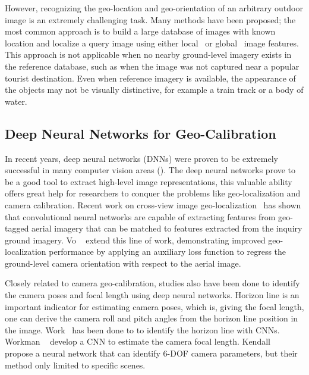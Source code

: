 However, recognizing the geo-location and geo-orientation of an
arbitrary outdoor image is an extremely challenging task.  Many
methods have been proposed; the most common approach is to build a
large database of images with known location and localize a query
image using either local~\cite{li2010location,schindler2008detecting}
or global~\cite{hays2008im2gps,doersch2012what} image features.  This
approach is not applicable when no nearby ground-level imagery exists
in the reference database, such as when the image was not captured
near a popular tourist destination.  Even when reference imagery is
available, the appearance of the objects may not be visually
distinctive, for example a train track or a body of water. 


\subsection{Deep Neural Networks for Geo-Calibration}
In recent years, deep neural networks (DNNs) were proven to be
extremely successful in many computer vision areas (). 
The deep neural networks prove to be a good tool to extract high-level
image representations, this valuable ability offers great help for researchers
to conquer the problems like geo-localization and camera calibration.
Recent work on cross-view image
geo-localization~\cite{lin2013cross,lin2015learning,workman2015geocnn,workman2015wide}
has shown that convolutional neural networks are capable of extracting
features from geo-tagged aerial imagery that can be matched to features extracted
from the inquiry ground imagery.  Vo \etal~\cite{vo2016localizing} extend this
line of work, demonstrating improved geo-localization performance by
applying an auxiliary loss function to regress the ground-level camera
orientation with respect to the aerial image. 

Closely related to camera geo-calibration, studies also have been done
to identify the camera poses and focal length using deep neural
networks.
Horizon line is an important indicator for estimating camera poses,
which is, giving the focal length, one can derive the camera roll and
pitch angles from the horizon line position in the image.
Work~\cite{zhai2016horizon, workman2016horizon, hold2017perceptual}
has been done to to identify the horizon line with CNNs.  Workman
\etal~\cite{workman2015deepfocal} develop a CNN to estimate the camera
focal length. Kendall \etal~\cite{kendall2015convolutional} propose a
neural network that can identify 6-DOF camera parameters, but their
method only limited to specific scenes.

